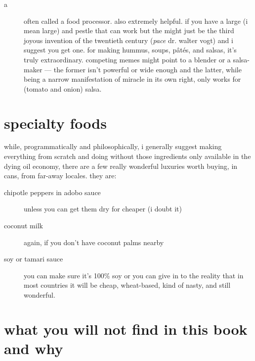 \begin{description}
  \item[a ] often called a food processor. also extremely
  helpful. if you have a large (i mean large)  and pestle that
  can work but the  might just be the third joyous invention of
  the twentieth century (\textit{pace} dr. walter vogt) and i suggest
  you get one. for making hummus, soups, p\^{a}t\'{e}s, and salsas,
  it's truly extraordinary. competing memes might point to a blender
  or a salsa-maker --- the former isn't powerful or wide enough and
  the latter, while being a narrow manifestation of miracle in its own
  right, only works for (tomato and onion) salsa.

\end{description}

\section{specialty foods}

while, programmatically and philosophically, i generally suggest
making everything from scratch and doing without those ingredients
only available in the dying oil economy, there are a few really
wonderful luxuries worth buying, in cans, from far-away locales. they
are:

\begin{description}

  \item[chipotle peppers in adobo sauce] unless you can get them dry
  for cheaper (i doubt it)

  \item[coconut milk] again, if you don't have coconut palms nearby

  \item[soy or tamari sauce] you can make sure it's 100\% soy or you
  can give in to the reality that in most countries it will be cheap,
  wheat-based, kind of nasty, and still wonderful.

\end{description}

\section{what you will not find in this book and why}

